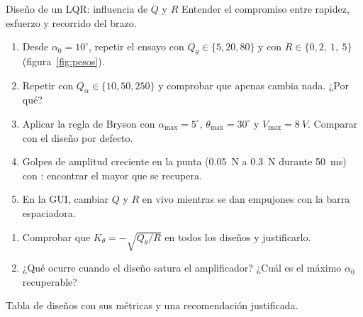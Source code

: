 \label{pr:lqr}
\begin{practica}{Diseño de un LQR: influencia de $Q$ y $R$}
\objetivos Entender el compromiso entre rapidez, esfuerzo y recorrido del brazo.
\procedimiento
\begin{enumerate}
  \item Desde $\alpha_0=10^\circ$, repetir el ensayo con $Q_\theta\in\{5,20,80\}$ y con $R\in\{0{,}2,\ 1,\ 5\}$ (figura~\ref{fig:pesos}).
  \item Repetir con $Q_\alpha\in\{10,50,250\}$ y comprobar que apenas cambia nada. ¿Por qué?
  \item Aplicar la regla de Bryson con $\alpha_{\max}=5^\circ$, $\theta_{\max}=30^\circ$ y $V_{\max}=\SI{8}{V}$. Comparar con el diseño por defecto.
  \item Golpes de amplitud creciente en la punta (\SI{0.05}{N} a \SI{0.3}{N} durante \SI{50}{ms}) con : encontrar el mayor que se recupera.
  \item En la GUI, cambiar $Q$ y $R$ en vivo mientras se dan empujones con la barra espaciadora.
\end{enumerate}
\preguntas
\begin{enumerate}
  \item Comprobar que $K_\theta=-\sqrt{Q_\theta/R}$ en todos los diseños y justificarlo.
  \item ¿Qué ocurre cuando el diseño satura el amplificador? ¿Cuál es el máximo $\alpha_0$ recuperable?
\end{enumerate}
\entregables Tabla de diseños con sus métricas y una recomendación justificada.
\end{practica}

